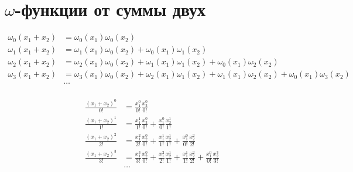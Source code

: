 
\section{$\omega$-функции от суммы двух}

\begin{equation*}\begin{aligned}
\omega_{0}(x_1 + x_2) &=   
  \omega_{0}(x_1) \omega_{0}(x_2)
\\
\omega_{1}(x_1 + x_2) &= 
  \omega_{1}(x_1) \omega_{0}(x_2)
+ \omega_{0}(x_1) \omega_{1}(x_2)
\\
\omega_{2}(x_1 + x_2) &= 
  \omega_{2}(x_1) \omega_{0}(x_2)
+ \omega_{1}(x_1) \omega_{1}(x_2)
+ \omega_{0}(x_1) \omega_{2}(x_2)
\\
\omega_{3}(x_1 + x_2) &= 
  \omega_{3}(x_1) \omega_{0}(x_2)
+ \omega_{2}(x_1) \omega_{1}(x_2)
+ \omega_{1}(x_1) \omega_{2}(x_2)
+ \omega_{0}(x_1) \omega_{3}(x_2)
\\
&\ldots \\
\end{aligned}\end{equation*}

\begin{equation*}\begin{aligned}
\frac{(x_1 + x_2)^0}{0!} &=
  \frac{x_1^0}{0!}\frac{x_2^0}{0!} 
\\
\frac{(x_1 + x_2)^1}{1!} &=
  \frac{x_1^1}{1!}\frac{x_2^0}{0!} 
+ \frac{x_1^0}{0!}\frac{x_2^1}{1!}
\\
\frac{(x_1 + x_2)^2}{2!} &=
  \frac{x_1^2}{2!}\frac{x_2^0}{0!}
+ \frac{x_1^1}{1!}\frac{x_2^1}{1!}
+ \frac{x_1^0}{0!}\frac{x_2^2}{2!}
\\
\frac{(x_1 + x_2)^3}{3!} &=
  \frac{x_1^3}{3!}\frac{x_2^0}{0!}
+ \frac{x_1^2}{2!}\frac{x_2^1}{1!}
+ \frac{x_1^1}{1!}\frac{x_2^2}{2!}
+ \frac{x_1^0}{0!}\frac{x_2^3}{3!}
\\
&\ldots \\
\end{aligned}\end{equation*}

